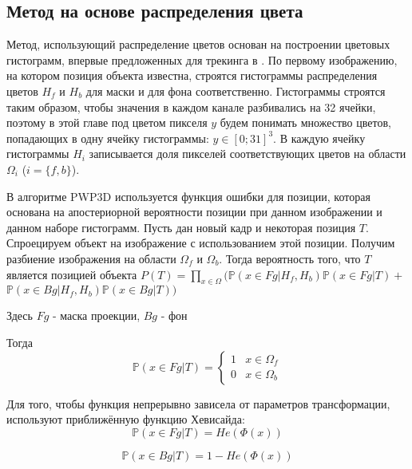 \subsection{Метод на основе распределения цвета}


Метод, использующий распределение цветов основан на построении цветовых
гистограмм, впервые предложенных для трекинга в \cite{Bibby2008}.
По первому изображению, на котором позиция объекта известна, строятся
гистограммы распределения цветов $H_f$ и $H_b$ для маски и для фона
соответственно.
Гистограммы строятся таким образом, чтобы значения в каждом канале разбивались
на 32 ячейки, поэтому в этой главе под цветом пикселя $y$ будем понимать
множество цветов, попадающих в одну ячейку гистограммы: $y \in [0; 31]^3$.
В каждую ячейку гистограммы $H_i$ записывается доля пикселей соответствующих
цветов на области $\Omega_i$ ($i = \{f, b\}$).

В алгоритме PWP3D \cite{PWP3D} используется функция ошибки для позиции, которая
основана на апостериорной вероятности позиции при данном изображении и данном
наборе гистограмм.
Пусть дан новый кадр и некоторая позиция $T$.
Спроецируем объект на изображение с использованием этой позиции.
Получим разбиение изображения на области $\Omega_f$ и $\Omega_b$.
Тогда вероятность того, что $T$
является позицией объекта
$
    P(T) = \prod\limits_{x \in \Omega}(\mathbb{P}(x \in Fg | H_f, H_b)\mathbb{P}(x \in Fg | T) +$ $\mathbb{P}(x \in Bg|H_f, H_b)\mathbb{P}(x \in Bg | T))
$


Здесь $Fg$ - маска проекции, $Bg$ - фон

Тогда
\begin{equation*}
    \mathbb{P}(x \in Fg | T) = 
     \begin{cases}
       1 &x \in \Omega_f\\
       0 &x \in \Omega_b
     \end{cases}
\end{equation*}

Для того, чтобы функция непрерывно зависела от параметров трансформации,
используют приближённую функцию Хевисайда:
$$
    \mathbb{P}(x \in Fg | T) = He(\Phi(x))
$$ 

$$
    \mathbb{P}(x \in Bg | T) = 1 - He(\Phi(x))
$$

